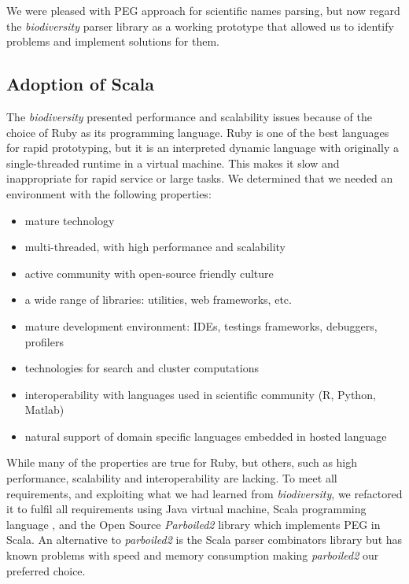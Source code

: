 \documentclass{bmcart}
\begin{document}
We were pleased with PEG approach for scientific names parsing, but now regard
the \textit{biodiversity} parser library as a working prototype that allowed us
to identify  problems and implement solutions for them.

\subsection*{Adoption of Scala}

The \textit{biodiversity} presented performance and scalability issues because
of the choice of Ruby as its programming language. Ruby is one of the best
languages for rapid prototyping, but it is an interpreted dynamic language with
originally a single-threaded runtime in a virtual machine. This makes it slow
and inappropriate for rapid service or large tasks. We determined that we
needed an environment with the following properties:

\begin{itemize}

    \item mature technology

    \item multi-threaded, with high performance and scalability

    \item active community with open-source friendly culture

    \item a wide range of libraries: utilities, web frameworks, etc.

    \item mature development environment: IDEs, testings frameworks, debuggers,
      profilers

    \item technologies for search and cluster computations

    \item interoperability with languages used in scientific community (R,
      Python, Matlab)

    \item natural support of domain specific languages embedded in hosted
      language

\end{itemize}

While many of the properties are true for Ruby, but others, such as high
performance, scalability and interoperability are lacking. To meet all
requirements, and exploiting what we had learned from \textit{biodiversity}, we
refactored it to fulfil all requirements using Java virtual machine, Scala
programming language \cite{odersky2004overview}, and the Open Source
\textit{Parboiled2} library \cite{parboiled2} which implements PEG in Scala. An
alternative to \textit{parboiled2} is the Scala parser combinators library
\cite{moors2008parser} but has known problems with speed and memory consumption
making \textit{parboiled2} our preferred choice.
\end{document}
